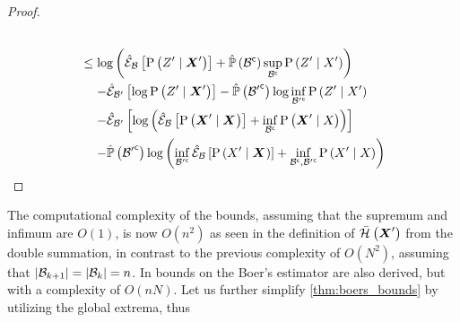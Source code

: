 \begin{proof}
\begin{align}
\begin{split}
		\end{split}\\
		\begin{split}
			&\leq\log\left(\partialestimator{\probcond{\observations{}^\prime}{\statesRV{}^\prime}}{\subSpace}+\estimatedmeasure{\stcomp{\subSpace}}\sup_{\stcomp{\subSpace}}\probcond{\observations{}^\prime}{\states{}^\prime}\right)\\
			&\phantomeq-\partialestimator{\log\probcond{\observations{}^\prime}{\statesRV{}^\prime}}{\subSpace^\prime}-\estimatedmeasure{\stcomp{\subSpace^\prime}}\log\inf_{\stcomp{\subSpace^\prime}}\probcond{\observations{}^\prime}{\states{}^\prime}\\
			&\phantomeq-\partialestimator{\log\left(\partialestimator{\probcond{\statesRV{}^\prime}{\statesRV{}}}{\subSpace}+\inf_{\stcomp{\subSpace}}\probcond{\statesRV{}^\prime}{\states{}}\right)}{\subSpace^\prime}\\
			&\phantomeq-\estimatedmeasure{\stcomp{\subSpace^\prime}}\log\left(\inf_{\stcomp{\subSpace^\prime}}\partialestimator{\probcond{\states{}^\prime}{\statesRV{}}}{\subSpace}+\inf_{\stcomp{\subSpace},\stcomp{\subSpace^\prime}}\probcond{\states{}^\prime}{\states{}}\right)
		\end{split}
	\end{align}
\end{proof}

The computational complexity of the bounds, assuming that the supremum and infimum are $O(1)$, is now $O(n^2)$ as seen in the definition of $\bar{\mathcal{H}}_{}\left({\boldsymbol X_{}^\prime}\right)$ from the double summation, in contrast to the previous complexity of $O(N^2)$, assuming that $\lvert\mathcal{B}_{k+1}\rvert=\lvert\mathcal{B}_{k}\rvert=n$. In \cite{Sztyglic22iros} bounds on the Boer's estimator are also derived, but with a complexity of $O(nN)$. Let us further simplify \cref{thm:boers_bounds} by utilizing the global extrema, thus

